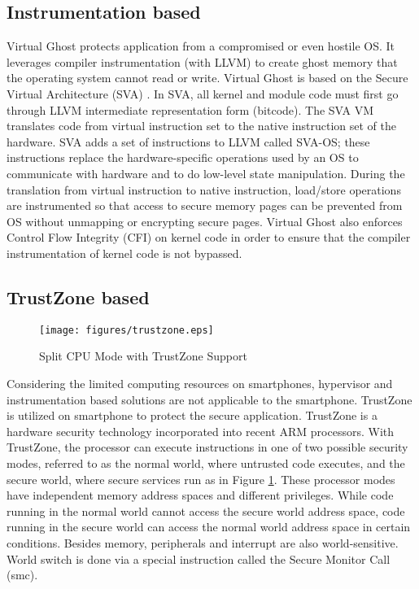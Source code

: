 \subsection{Instrumentation based}

Virtual Ghost protects application from a compromised or even hostile OS. It
leverages compiler instrumentation (with LLVM) to create ghost memory that the
operating system cannot read or write. Virtual Ghost is based on the Secure
Virtual Architecture (SVA) \cite{SVA}. In SVA, all kernel and module code must
first go through LLVM intermediate representation form (bitcode). The SVA VM
translates code from virtual instruction set to the native instruction set of
the hardware. SVA adds a set of instructions to LLVM called SVA-OS; these
instructions replace the hardware-specific operations used by an OS to
communicate with hardware and to do low-level state manipulation. During the
translation from virtual instruction to native instruction, load/store
operations are instrumented so that access to secure memory pages can be
prevented from OS without unmapping or encrypting secure pages. Virtual Ghost
also enforces Control Flow Integrity (CFI) \cite{CFI} on kernel code in order
to ensure that the compiler instrumentation of kernel code is not bypassed.

\subsection{TrustZone based}

\begin{figure}[htb]
\centering
\texttt{[image: figures/trustzone.eps]}
\caption{Split CPU Mode with TrustZone Support}
\label{fig:trustzone}
\end{figure}

Considering the limited computing resources on smartphones, hypervisor and
instrumentation based solutions are not applicable to the smartphone. TrustZone
\cite{trustzone} is utilized on smartphone to protect the secure application.
TrustZone is a hardware security technology incorporated into recent ARM
processors. With TrustZone, the processor can execute instructions in one of
two possible security modes, referred to as the normal world, where untrusted
code executes, and the secure world, where secure services run as in Figure
\ref{fig:trustzone}. These processor modes have independent memory address
spaces and different privileges. While code running in the normal world cannot
access the secure world address space, code running in the secure world can
access the normal world address space in certain conditions. Besides memory,
peripherals and interrupt are also world-sensitive. World switch is done via a
special instruction called the Secure Monitor Call (smc).

